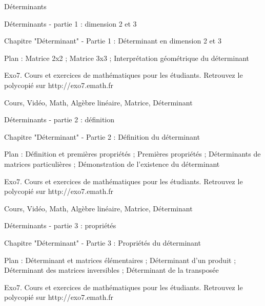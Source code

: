 
   Déterminants




Déterminants - partie 1 : dimension 2 et 3



Chapitre "Déterminant" - Partie 1 : Déterminant en dimension 2 et 3

Plan : Matrice 2x2 ; Matrice 3x3 ; 
Interprétation géométrique du déterminant

Exo7. Cours et exercices de mathématiques pour les étudiants.
Retrouvez le polycopié sur http://exo7.emath.fr


Cours, Vidéo, Math, Algèbre linéaire, Matrice, Déterminant




Déterminants - partie 2 : définition



Chapitre "Déterminant" - Partie 2 : Définition du déterminant

Plan : Définition et premières propriétés ; Premières propriétés ;
Déterminants de matrices particulières ; Démonstration de l'existence du déterminant

Exo7. Cours et exercices de mathématiques pour les étudiants.
Retrouvez le polycopié sur http://exo7.emath.fr


Cours, Vidéo, Math, Algèbre linéaire, Matrice, Déterminant




Déterminants - partie 3 : propriétés



Chapitre "Déterminant" - Partie 3 : Propriétés du déterminant

Plan : Déterminant et matrices élémentaires ; Déterminant d'un produit ;
Déterminant des matrices inversibles ; Déterminant de la transposée

Exo7. Cours et exercices de mathématiques pour les étudiants.
Retrouvez le polycopié sur http://exo7.emath.fr

